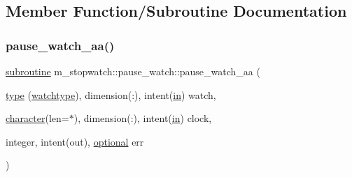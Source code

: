 \subsection{Member Function/\+Subroutine Documentation}
\mbox{\label{interfacem__stopwatch_1_1pause__watch_a25eb00588b156d2365959dba3f94c12d}} 
\subsubsection{\texorpdfstring{pause\+\_\+watch\+\_\+aa()}{pause\_watch\_aa()}}
{\footnotesize\ttfamily \hyperlink{M__stopwatch_83_8txt_acfbcff50169d691ff02d4a123ed70482}{subroutine} m\+\_\+stopwatch\+::pause\+\_\+watch\+::pause\+\_\+watch\+\_\+aa (\begin{DoxyParamCaption}\item[{\hyperlink{stop__watch_83_8txt_a70f0ead91c32e25323c03265aa302c1c}{type} (\hyperlink{structm__stopwatch_1_1watchtype}{watchtype}), dimension(\+:), intent(\hyperlink{M__journal_83_8txt_afce72651d1eed785a2132bee863b2f38}{in})}]{watch,  }\item[{\hyperlink{option__stopwatch_83_8txt_abd4b21fbbd175834027b5224bfe97e66}{character}(len=$\ast$), dimension(\+:), intent(\hyperlink{M__journal_83_8txt_afce72651d1eed785a2132bee863b2f38}{in})}]{clock,  }\item[{integer, intent(out), \hyperlink{option__stopwatch_83_8txt_aa4ece75e7acf58a4843f70fe18c3ade5}{optional}}]{err }\end{DoxyParamCaption})\hspace{0.3cm}{\ttfamily [private]}}

\mbox{\label{interfacem__stopwatch_1_1pause__watch_ae80c28ea733118509d6b9ab13f77c4ac}} 
